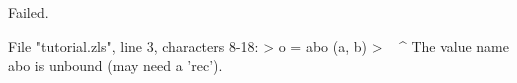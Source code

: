 \runverbatimfalse
{}
\begin{RunVerbatimMsg}
Failed.
\end{RunVerbatimMsg}
\begin{RunVerbatimErr}
File "tutorial.zls", line 3, characters 8-18:
>    o = abo (a, b)
>        ^^^^^^^^^^
The value name abo is unbound (may need a 'rec').
\end{RunVerbatimErr}

